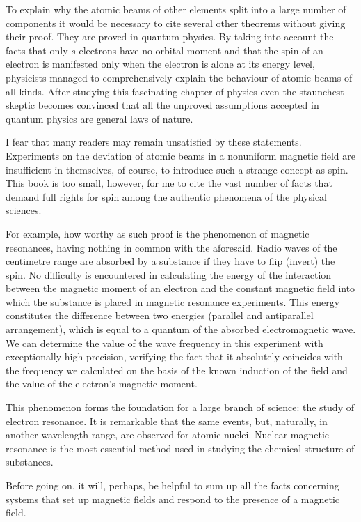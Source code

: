 To explain why the atomic beams of other elements split into a large number of components it would be necessary to cite several other theorems without giving their proof. They are proved in quantum physics. By taking into account the facts that only $s$-electrons have no orbital moment and that the spin of an electron is manifested only when the electron is alone at its energy level, physicists managed to comprehensively explain the behaviour of atomic beams of all kinds. After studying this fascinating chapter of physics even the staunchest skeptic becomes convinced that all the unproved assumptions accepted in quantum physics are general
laws of nature.

I fear that many readers may remain unsatisfied by these statements. Experiments on the deviation of atomic beams in a nonuniform magnetic field are insufficient in themselves, of course, to introduce such a strange concept as spin. This book is too small, however, for me to cite the vast number of facts that demand full rights for spin among the authentic phenomena of the physical sciences.

For example, how worthy as such proof is the phenomenon of magnetic resonances, having nothing in common with the aforesaid. Radio waves of the centimetre range are absorbed by a substance if they have to flip (invert) the spin. No difficulty is encountered in calculating the energy of the interaction between the magnetic moment of an electron and the constant magnetic field into which the substance is placed in magnetic resonance experiments. This energy constitutes the difference between two energies (parallel and antiparallel arrangement), which is equal to a quantum of the absorbed electromagnetic wave. We can determine the value of the wave frequency in this experiment with exceptionally high precision, verifying the fact that it absolutely coincides with the frequency we calculated on the basis of the known induction of the field and the value of the electron's magnetic moment.

This phenomenon forms the foundation for a large branch of science: the study of electron resonance. It is remarkable that the same events, but, naturally, in another wavelength range, are observed for atomic nuclei. Nuclear magnetic resonance is the most essential method used in studying the chemical structure of substances.

Before going on, it will, perhaps, be helpful to sum up all the facts concerning systems that set up magnetic fields and respond to the presence of a magnetic field.

